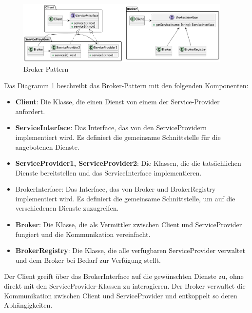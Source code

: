 \documentclass[../vs-script-first-v01.tex]{subfiles}
\begin{document}
\begin{figure}[ht]
  \centering
  \includegraphics[width=0.95\textwidth]{fig/uml/broker.png}
  \caption{Broker Pattern}
  \label{fig:broker}
\end{figure}

Das Diagramm \ref{fig:broker} beschreibt das Broker-Pattern mit den folgenden Komponenten:
\begin{itemize}
\item \textbf{Client}: Die Klasse, die einen Dienst von einem der Service-Provider anfordert.
\item \textbf{ServiceInterface}: Das Interface, das von den ServiceProvidern implementiert wird. Es definiert die gemeinsame Schnittstelle für die angebotenen Dienste.
\item \textbf{ServiceProvider1, ServiceProvider2}: Die Klassen, die die tatsächlichen Dienste bereitstellen und das ServiceInterface implementieren.
\item BrokerInterface: Das Interface, das von Broker und BrokerRegistry implementiert wird. Es definiert die gemeinsame Schnittstelle, um auf die verschiedenen Dienste zuzugreifen.
\item \textbf{Broker}: Die Klasse, die als Vermittler zwischen Client und ServiceProvider fungiert und die Kommunikation vereinfacht.
\item \textbf{BrokerRegistry}: Die Klasse, die alle verfügbaren ServiceProvider verwaltet und dem Broker bei Bedarf zur Verfügung stellt.
\end{itemize}
Der Client greift über das BrokerInterface auf die gewünschten Dienste zu, ohne direkt mit den ServiceProvider-Klassen zu interagieren. Der Broker verwaltet die Kommunikation zwischen Client und ServiceProvider und entkoppelt so deren Abhängigkeiten.
\end{document}
